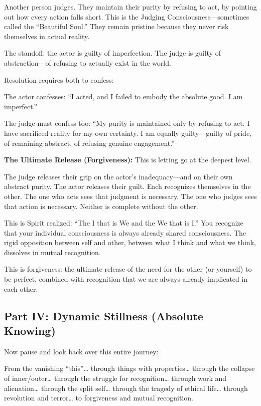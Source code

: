 Another person judges. They maintain their purity by refusing to act, by pointing out how every action falls short. This is the Judging Consciousness---sometimes called the ``Beautiful Soul.'' They remain pristine because they never risk themselves in actual reality.

The standoff: the actor is guilty of imperfection. The judge is guilty of abstraction---of refusing to actually exist in the world.

Resolution requires both to confess:

The actor confesses: ``I acted, and I failed to embody the absolute good. I am imperfect.''

The judge must confess too: ``My purity is maintained only by refusing to act. I have sacrificed reality for my own certainty. I am equally guilty---guilty of pride, of remaining abstract, of refusing genuine engagement.''

\textbf{The Ultimate Release (Forgiveness):} This is letting go at the deepest level.

The judge releases their grip on the actor's inadequacy---and on their own abstract purity. The actor releases their guilt. Each recognizes themselves in the other. The one who acts sees that judgment is necessary. The one who judges sees that action is necessary. Neither is complete without the other.

This is Spirit realized: ``The I that is We and the We that is I.'' You recognize that your individual consciousness is always already shared consciousness. The rigid opposition between self and other, between what I think and what we think, dissolves in mutual recognition.

This is forgiveness: the ultimate release of the need for the other (or yourself) to be perfect, combined with recognition that we are always already implicated in each other.

\subsection{Part IV: Dynamic Stillness (Absolute Knowing)}\label{part-iv-dynamic-stillness-absolute-knowing}

Now pause and look back over this entire journey:

From the vanishing ``this''\ldots{} through things with properties\ldots{} through the collapse of inner/outer\ldots{} through the struggle for recognition\ldots{} through work and alienation\ldots{} through the split self\ldots{} through the tragedy of ethical life\ldots{} through revolution and terror\ldots{} to forgiveness and mutual recognition.

